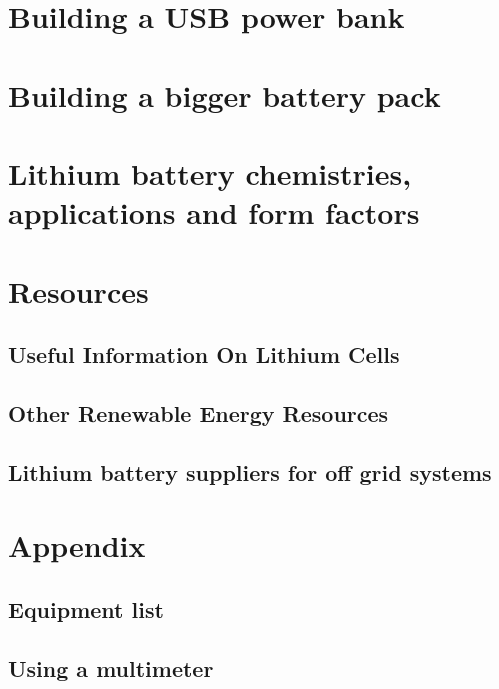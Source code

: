 \documentclass[letterpaper,10pt,english]{sphinxmanual}
\begin{document}
\chapter{Building a USB power bank}
\label{\detokenize{building_a_usb_power_bank:building-a-usb-power-bank}}\label{\detokenize{building_a_usb_power_bank::doc}}

\chapter{Building a bigger battery pack}
\label{\detokenize{building_a_bigger_battery_pack:building-a-bigger-battery-pack}}\label{\detokenize{building_a_bigger_battery_pack::doc}}

\chapter{Lithium battery chemistries, applications and form factors}
\label{\detokenize{lithium_battery_chemistries__applications_and_form_factors:lithium-battery-chemistries-applications-and-form-factors}}\label{\detokenize{lithium_battery_chemistries__applications_and_form_factors::doc}}

\chapter{Resources}
\label{\detokenize{resources:resources}}\label{\detokenize{resources::doc}}

\section{Useful Information On Lithium Cells}
\label{\detokenize{resources:useful-information-on-lithium-cells}}

\section{Other Renewable Energy Resources}
\label{\detokenize{resources:other-renewable-energy-resources}}

\section{Lithium battery suppliers for off grid systems}
\label{\detokenize{resources:lithium-battery-suppliers-for-off-grid-systems}}

\chapter{Appendix}
\label{\detokenize{appendix:appendix}}\label{\detokenize{appendix::doc}}

\section{Equipment list}
\label{\detokenize{appendix:equipment-list}}

\section{Using a multimeter}
\label{\detokenize{appendix:using-a-multimeter}}


\renewcommand{\indexname}{Index}
\printindex
\end{document}
